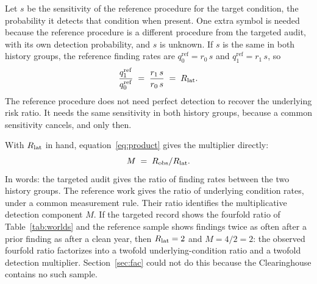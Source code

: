 Let $s$ be the sensitivity of the reference procedure for the target
condition, the probability it detects that condition when present. One extra
symbol is needed because the reference procedure is a different procedure
from the targeted audit, with its own detection probability, and $s$ is
unknown. If $s$ is the same in both history groups, the reference finding
rates are $q^{\mathrm{ref}}_0 = r_0\, s$ and $q^{\mathrm{ref}}_1 = r_1\, s$,
so
%
\begin{equation}\label{eq:ref}
  \frac{q^{\mathrm{ref}}_1}{q^{\mathrm{ref}}_0}
  \;=\;
  \frac{r_1\, s}{r_0\, s}
  \;=\;
  R_{\mathrm{lat}} .
\end{equation}
%
The reference procedure does not need perfect detection to recover the
underlying risk ratio. It needs the same sensitivity in both history groups,
because a common sensitivity cancels, and only then.
\begin{center}
\end{center}
With $R_{\mathrm{lat}}$ in hand, equation~\eqref{eq:product} gives the multiplier
directly:
%
\begin{equation}\label{eq:mfromref}
  M \;=\; R_{\mathrm{obs}} / R_{\mathrm{lat}} .
\end{equation}
%
In words: the targeted audit gives the ratio of finding rates between the two
history groups. The reference work gives the ratio of underlying condition
rates, under a common measurement rule. Their ratio identifies the
multiplicative detection component $M$. If the targeted record shows the
fourfold ratio of Table~\ref{tab:worlds} and the reference sample shows
findings twice as often after a prior finding as after a clean year, then
$R_{\mathrm{lat}} = 2$ and $M = 4/2 = 2$: the observed fourfold ratio factorizes into a
twofold underlying-condition ratio and a twofold detection multiplier.
Section~\ref{sec:fac} could not do this because the Clearinghouse contains no
such sample.

